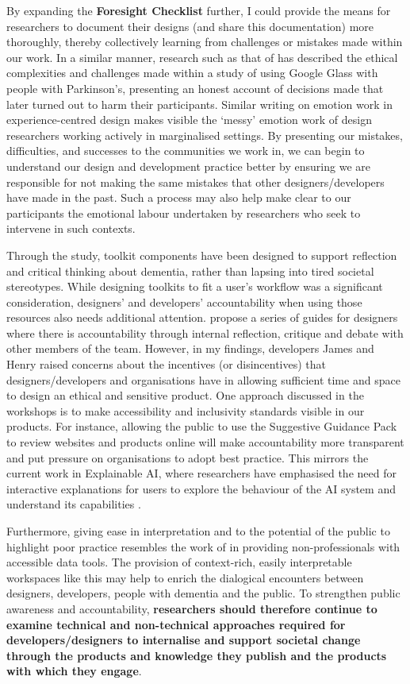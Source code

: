 By expanding the \textbf{Foresight Checklist} further, I could provide the means for researchers to document their designs (and share this documentation) more thoroughly, thereby collectively learning from challenges or mistakes made within our work. In a similar manner, research such as that of \cite{vines_our_2017} has described the ethical complexities and challenges made within a study of using Google Glass with people with Parkinson’s, presenting an honest account of decisions made that later turned out to harm their participants. Similar writing on emotion work in experience-centred design \citep{balaam_emotion_2019} makes visible the ‘messy’ emotion work of design researchers working actively in marginalised settings. By presenting our mistakes, difficulties, and successes to the communities we work in, we can begin to understand our design and development practice better by ensuring we are responsible for not making the same mistakes that other designers/developers have made in the past. Such a process may also help make clear to our participants the emotional labour undertaken by researchers who seek to intervene in such contexts.

Through the study, toolkit components have been designed to support reflection and critical thinking about dementia, rather than lapsing into tired societal stereotypes. While designing toolkits to fit a user’s workflow was a significant consideration, designers’ and developers’ accountability when using those resources also needs additional attention. \cite{frauenberger2015pursuit} propose a series of guides for designers where there is accountability through internal reflection, critique and debate with other members of the team. However, in my findings, developers James and Henry raised concerns about the incentives (or disincentives) that designers/developers and organisations have in allowing sufficient time and space to design an ethical and sensitive product. One approach discussed in the workshops is to make accessibility and inclusivity standards visible in our products. For instance, allowing the public to use the Suggestive Guidance Pack to review websites and products online will make accountability more transparent and put pressure on organisations to adopt best practice. This mirrors the current work in Explainable AI, where researchers have emphasised the need for interactive explanations for users to explore the behaviour of the AI system and understand its capabilities \citep{abdul2018trends}. 

Furthermore, giving ease in interpretation and to the potential of the public to highlight poor practice resembles the work of \cite{puussaar2018making} in providing non-professionals with accessible data tools. The provision of context-rich, easily interpretable workspaces like this may help to enrich the dialogical encounters between designers, developers, people with dementia and the public. To strengthen public awareness and accountability, \textbf{researchers should therefore continue to examine technical and non-technical approaches required for developers/designers to internalise and support societal change through the products and knowledge they publish and the products with which they engage}.

